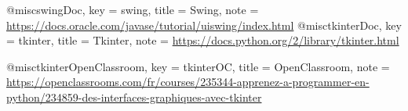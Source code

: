 @misc{swingDoc,
  key = {swing},
  title = {Swing},
  note = {\url{https://docs.oracle.com/javase/tutorial/uiswing/index.html}}
}
@misc{tkinterDoc,
  key = {tkinter},
  title = {Tkinter},
  note = {\url{https://docs.python.org/2/library/tkinter.html}}
}

@misc{tkinterOpenClassroom,
  key = {tkinterOC},
  title = {OpenClassroom},
  note = {\url{https://openclassrooms.com/fr/courses/235344-apprenez-a-programmer-en-python/234859-des-interfaces-graphiques-avec-tkinter}}
}
